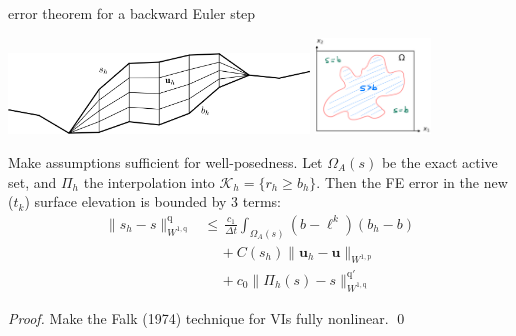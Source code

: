 \documentclass[10pt,svgnames]{beamer}
\newcommand{\bu}{\mathbf{u}}
\newcommand{\cK}{\mathcal{K}}
\newcommand{\pp}{\mathrm{p}}
\newcommand{\qq}{\mathrm{q}}
\begin{document}
\begin{frame}{error theorem for a backward Euler step}

\noindent \includegraphics[width=0.6\textwidth]{extruded} \hfill \includegraphics[width=0.23\textwidth]{mapplane}

\medskip
\begin{theorem}[B '24]
Make assumptions sufficient for well-posedness.  Let $\Omega_A(s)$ be  the exact active set, and $\Pi_h$ the interpolation into $\cK_h = \{r_h \ge b_h\}$.  Then the FE error in the new ($t_k$) surface elevation is bounded by 3 terms:
\begin{align*}
\|s_h-s\|_{W^{1,\qq}}^\qq &\le \, \frac{c_1}{\Delta t} \int_{\Omega_A(s)} (b - \ell^k) (b_h - b) \\
   &\quad\, + C(s_h) \big\|\bu_h - \bu\big\|_{W^{1,\pp}} \\
   &\quad\, + c_0 \|\Pi_h(s) - s\|_{W^{1,\qq}}^{\qq'}
\end{align*}
\end{theorem}

\noindent \emph{Proof.} Make the Falk (1974) technique for VIs fully nonlinear. \qed
\end{frame}
\end{document}
